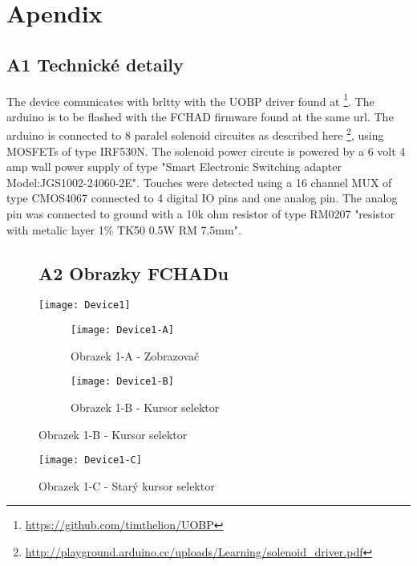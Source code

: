 \appendix
{}
\thispagestyle{empty}
\renewcommand{\appendixname}{Apendix}%


\chapter*{Apendix}

\section*{A1 Technické detaily}

The device comunicates with brltty with the UOBP driver found at \footnote{\url{https://github.com/timthelion/UOBP}}.  The arduino is to be flashed with the FCHAD firmware found at the same url.  The arduino is connected to 8 paralel solenoid circuites as described here \footnote{\url{http://playground.arduino.cc/uploads/Learning/solenoid_driver.pdf}}, using MOSFETs of type IRF530N.  The solenoid power circute is powered by a 6 volt 4 amp wall power supply of type "Smart Electronic Switching adapter Model:JGS1002-24060-2E".  Touches were detected using a 16 channel MUX of type CMOS4067 connected to 4 digital IO pins and one analog pin.  The analog pin was connected to ground with a 10k ohm resistor of type RM0207 "resistor with metalic layer 1\% TK50 0.5W RM 7.5mm".


\clearpage
\begin{figure}
\section*{A2 Obrazky FCHADu}
\texttt{[image: Device1]}
\begin{subfigure}{.5\textwidth}
  \centering
  \texttt{[image: Device1-A]}
  \caption{Obrazek 1-A - Zobrazovač}
  \label{fig:sub1}
\end{subfigure}%
\begin{subfigure}{.5\textwidth}
  \centering
  \texttt{[image: Device1-B]}
  \caption{Obrazek 1-B - Kursor selektor}
  \label{fig:sub2}
\end{subfigure}

\label{fig:test}
\end{figure}
\begin{figure}
\texttt{[image: Device1-C]}
\caption{Obrazek 1-C - Starý kursor selektor}
\label{fig:sub2}
\end{figure}

